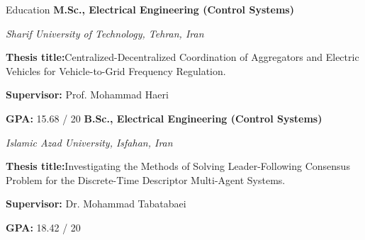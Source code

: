 \begin{rubric}{Education}
\entry*[2017 -- 2019]%
	\textbf{M.Sc., Electrical Engineering (Control Systems)}
	\par \emph{Sharif University of Technology, Tehran, Iran}
    \par \textbf{Thesis title:}{Centralized-Decentralized Coordination of Aggregators and Electric Vehicles for Vehicle-to-Grid Frequency Regulation.}
    \par \textbf{Supervisor:} Prof. Mohammad Haeri
    \par \textbf{GPA:} 15.68 / 20
%
\entry*[2014 -- 2017]%
	\textbf{B.Sc., Electrical Engineering (Control Systems)} 
    \par \emph{Islamic Azad University, Isfahan, Iran}
    \par \textbf{Thesis title:}{Investigating the Methods of Solving Leader-Following Consensus Problem for the Discrete-Time Descriptor Multi-Agent Systems.}
    \par \textbf{Supervisor:} Dr. Mohammad Tabatabaei
    \par \textbf{GPA:} 18.42 / 20
% 
\end{rubric}